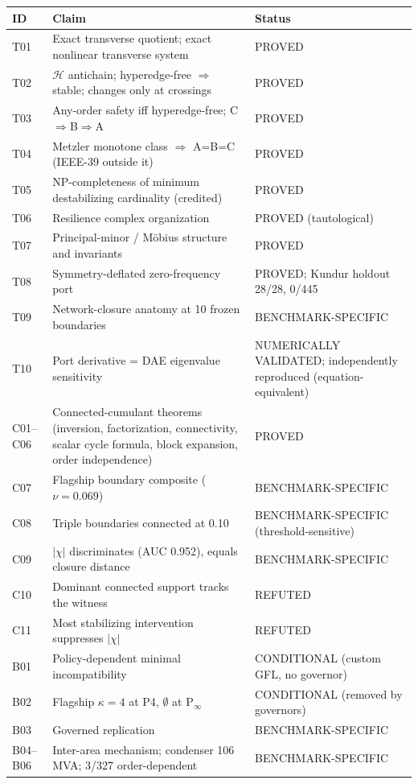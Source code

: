 \documentclass[10pt,a4paper]{article}
\theoremstyle{definition}
\newcommand{\Hy}{\mathcal{H}}
\begin{document}
\begin{longtable}{@{}L{1.0cm}L{10.6cm}L{3.8cm}@{}}
\toprule
ID & Claim & Status\\
\midrule\endhead
T01 & Exact transverse quotient; exact nonlinear transverse system & PROVED\\
T02 & $\Hy$ antichain; hyperedge-free $\Rightarrow$ stable; changes only at crossings & PROVED\\
T03 & Any-order safety iff hyperedge-free; C$\Rightarrow$B$\Rightarrow$A & PROVED\\
T04 & Metzler monotone class $\Rightarrow$ A=B=C (IEEE-39 outside it) & PROVED\\
T05 & NP-completeness of minimum destabilizing cardinality (credited) & PROVED\\
T06 & Resilience complex organization & PROVED (tautological)\\
T07 & Principal-minor / M\"obius structure and invariants & PROVED\\
T08 & Symmetry-deflated zero-frequency port & PROVED; Kundur holdout 28/28, 0/445\\
T09 & Network-closure anatomy at 10 frozen boundaries & BENCHMARK-SPECIFIC\\
T10 & Port derivative = DAE eigenvalue sensitivity & NUMERICALLY VALIDATED; independently reproduced (equation-equivalent)\\
C01--C06 & Connected-cumulant theorems (inversion, factorization, connectivity, scalar cycle formula, block expansion, order independence) & PROVED\\
C07 & Flagship boundary composite ($\nu=0.069$) & BENCHMARK-SPECIFIC\\
C08 & Triple boundaries connected at 0.10 & BENCHMARK-SPECIFIC (threshold-sensitive)\\
C09 & $|\chi|$ discriminates (AUC 0.952), equals closure distance & BENCHMARK-SPECIFIC\\
C10 & Dominant connected support tracks the witness & REFUTED\\
C11 & Most stabilizing intervention suppresses $|\chi|$ & REFUTED\\
B01 & Policy-dependent minimal incompatibility & CONDITIONAL (custom GFL, no governor)\\
B02 & Flagship $\kappa=4$ at P4, $\emptyset$ at P$_\infty$ & CONDITIONAL (removed by governors)\\
B03 & Governed replication & BENCHMARK-SPECIFIC\\
B04--B06 & Inter-area mechanism; condenser 106\,MVA; 3/327 order-dependent & BENCHMARK-SPECIFIC\\

\end{longtable}
\end{document}
